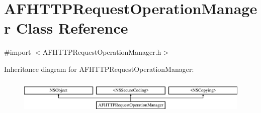 \hypertarget{interface_a_f_h_t_t_p_request_operation_manager}{}\section{A\+F\+H\+T\+T\+P\+Request\+Operation\+Manager Class Reference}
\label{interface_a_f_h_t_t_p_request_operation_manager}


{\ttfamily \#import $<$A\+F\+H\+T\+T\+P\+Request\+Operation\+Manager.\+h$>$}

Inheritance diagram for A\+F\+H\+T\+T\+P\+Request\+Operation\+Manager\+:\begin{figure}[H]
\begin{center}
\leavevmode
\includegraphics[height=1.704718cm]{interface_a_f_h_t_t_p_request_operation_manager}
\end{center}
\end{figure}
